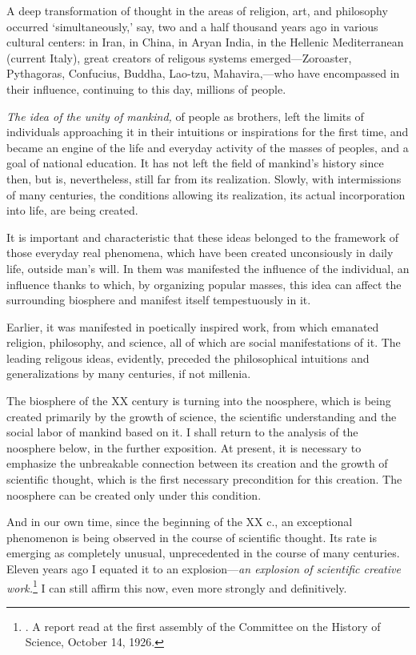 \Section %
A deep transformation of thought in the areas of religion, art, and philosophy
occurred `simultaneously,' say, two and a half thousand years ago in various
cultural centers: in Iran, in China, in Aryan India, in the Hellenic
Mediterranean (current Italy), great creators of religous systems
emerged---Zoroaster, Pythagoras, Confucius, Buddha, Lao-tzu, Mahavira,---who
have encompassed in their influence, continuing to this day, millions of
people.

\emph{The idea of the unity of mankind,} of people as brothers, left the limits
of individuals approaching it in their intuitions or inspirations for the first
time, and became an engine of the life and everyday activity of the masses of
peoples, and a goal of national education.  It has not left the field of
mankind's history since then, but is, nevertheless, still far from its
realization.  Slowly, with intermissions of many centuries, the conditions
allowing its realization, its actual incorporation into life, are being
created.

It is important and characteristic that these ideas belonged to the framework
of those everyday real phenomena, which have been created unconsiously in daily
life, outside man's will.  In them was manifested the influence of the
individual, an influence thanks to which, by organizing popular masses, this
idea can affect the surrounding biosphere and manifest itself tempestuously in
it.

Earlier, it was manifested in poetically inspired work, from which emanated
religion, philosophy, and science, all of which are social manifestations of
it.  The leading religous ideas, evidently, preceded the philosophical
intuitions and generalizations by many centuries, if not millenia.

The biosphere of the XX century is turning into the noosphere, which is being
created primarily by the growth of science, the scientific understanding and
the social labor of mankind based on it.  I shall return to the analysis of the
noosphere below, in the further exposition.  At present, it is necessary to
emphasize the unbreakable connection between its creation and the growth of
scientific thought, which is the first necessary precondition for this
creation.  The noosphere can be created only under this condition.


\Section %
And in our own time, since the beginning of the XX c., an exceptional
phenomenon is being observed in the course of scientific thought.  Its rate is
emerging as completely unusual, unprecedented in the course of many centuries.
Eleven years ago I equated it to an explosion---\emph{an explosion of
scientific creative work.}\footnote{
	\cite{vernadsky1927mysli}.  A report read at the first assembly of the
	Committee on the History of Science,
	October 14, 1926.
}
I can still affirm this now, even more strongly and definitively.

